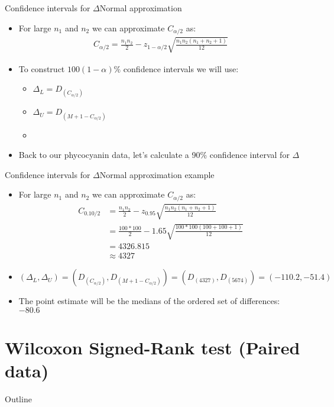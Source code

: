 \documentclass[xcolor=dvipsnames]{beamer}
\begin{document}
\begin{frame}{Confidence intervals for $\Delta$}{Normal approximation}
	\begin{itemize}
		\item For large $n_1$ and $n_2$ we can approximate $C_{\alpha / 2}$ as:
		\begin{gather*}
		C_{\alpha / 2} = \frac{n_1 n_2}{2} - z_{1-\alpha / 2} \sqrt{\frac{n_1 n_2(n_1+n_2+1)}{12}}
		\end{gather*}
		\item To construct $100(1-\alpha) \%$ confidence intervals we will use:
		\begin{itemize}
			\item $\Delta_L = D_{(C_{\alpha / 2})}$
			\item $\Delta_U = D_{(M + 1 - C_{\alpha / 2})}$
			\item[]
		\end{itemize}
	\item Back to our phycocyanin data, let's calculate a 90\% confidence interval for $\Delta$
	\end{itemize}
\end{frame}

\begin{frame}{Confidence intervals for $\Delta$}{Normal approximation example}
\begin{itemize}
	\item For large $n_1$ and $n_2$ we can approximate $C_{\alpha / 2}$ as:
	\begin{align*}
	C_{0.10 / 2} &= \frac{n_1 n_2}{2} - z_{0.95} \sqrt{\frac{n_1 n_2(n_1+n_2+1)}{12}} \\
	&=\frac{100*100}{2} - 1.65 \sqrt{\frac{100*100(100+100+1)}{12}} \\
	&= 4326.815 \\
	&\approx 4327
	\end{align*}
	\item $(\Delta_L, \Delta_U) = \left(D_{(C_{\alpha / 2})}, D_{(M + 1 - C_{\alpha / 2})} \right) = \left(D_{(4327)}, D_{(5674)}\right) = (-110.2, -51.4)$
	\item The point estimate will be the medians of the ordered set of differences: $-80.6$
\end{itemize}
\end{frame}

\section{Wilcoxon Signed-Rank test (Paired data)}
\begin{frame}{Outline}
\tableofcontents[currentsection,subsectionstyle=show/shaded/hide]
\end{frame}
\end{document}

